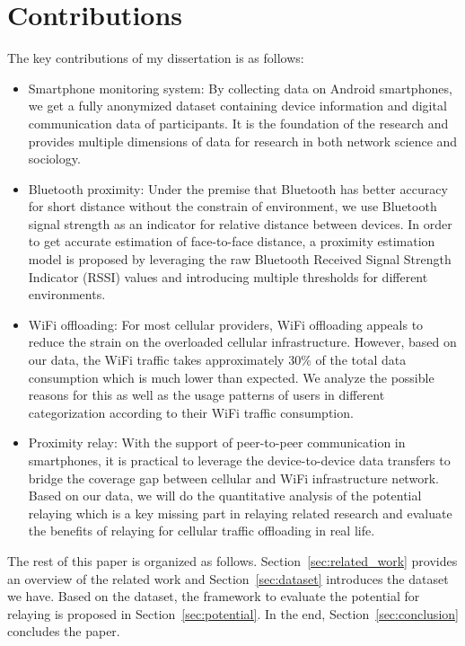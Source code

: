 \section{Contributions}
The key contributions of my dissertation is as follows:
\begin{itemize}
\item Smartphone monitoring system: By collecting data on Android smartphones, we get a fully anonymized dataset containing device information and digital communication data of participants. It is the foundation of the research and provides multiple dimensions of data for research in both network science and sociology. 

\item Bluetooth proximity: Under the premise that Bluetooth has better accuracy for short distance without the constrain of environment, we use Bluetooth signal strength as an indicator for relative distance between devices. In order to get accurate estimation of face-to-face distance, a proximity estimation model is proposed by leveraging the raw Bluetooth Received Signal Strength Indicator (RSSI) values and introducing multiple thresholds for different environments. 

\item WiFi offloading: For most cellular providers, WiFi offloading appeals to reduce the strain on the overloaded cellular infrastructure. However, based on our data, the WiFi traffic takes approximately 30\% of the total data consumption which is much lower than expected. We analyze the possible reasons for this as well as the usage patterns of users in different categorization according to their WiFi traffic consumption. 

\item Proximity relay: 
With the support of peer-to-peer communication in smartphones, it is practical to leverage the device-to-device data transfers to bridge the coverage gap between cellular and WiFi infrastructure network. Based on our data, we will do the quantitative analysis of the potential relaying which is a key missing part in relaying related research and evaluate the benefits of relaying for cellular traffic offloading in real life. 
\end{itemize}

The rest of this paper is organized as follows. Section~\ref{sec:related_work} provides an overview of the related work and Section~\ref{sec:dataset} introduces the dataset we have. Based on the dataset, the framework to evaluate the potential for relaying is proposed in Section~\ref{sec:potential}. In the end, Section~\ref{sec:conclusion} concludes the paper.
